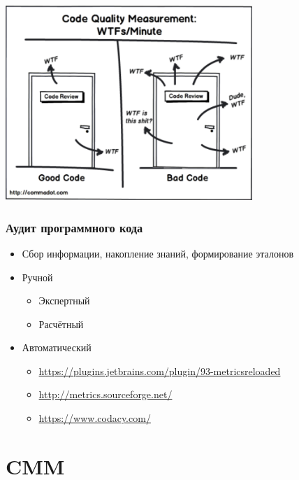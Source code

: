 \documentclass{../../slides-style}
\begin{document}
    \begin{frame}
        \begin{center}
            \includegraphics[width=0.7\textwidth]{wtfsPerMinute.png}
        \end{center}
    \end{frame}

    \begin{frame}
        \frametitle{Аудит программного кода}
        \begin{itemize}
            \item Сбор информации, накопление знаний, формирование эталонов
            \item Ручной
            \begin{itemize}
                \item Экспертный
                \item Расчётный
            \end{itemize}
            \item Автоматический
            \begin{itemize}
                \item \url{https://plugins.jetbrains.com/plugin/93-metricsreloaded}
                \item \url{http://metrics.sourceforge.net/}
                \item \url{https://www.codacy.com/}
            \end{itemize}
        \end{itemize}
    \end{frame}

    \section{CMM}
\end{document}
